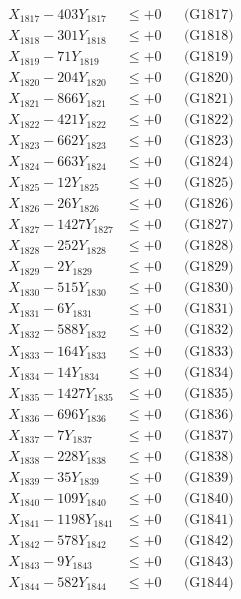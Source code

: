 \documentclass[a4paper,10pt]{article}
\begin{document}
{\begin{align}
X_{1817} - 403Y_{1817} &\leq +0 && \text{(G1817)} \\
X_{1818} - 301Y_{1818} &\leq +0 && \text{(G1818)} \\
X_{1819} - 71Y_{1819} &\leq +0 && \text{(G1819)} \\
X_{1820} - 204Y_{1820} &\leq +0 && \text{(G1820)} \\
\allowbreak
X_{1821} - 866Y_{1821} &\leq +0 && \text{(G1821)} \\
X_{1822} - 421Y_{1822} &\leq +0 && \text{(G1822)} \\
X_{1823} - 662Y_{1823} &\leq +0 && \text{(G1823)} \\
X_{1824} - 663Y_{1824} &\leq +0 && \text{(G1824)} \\
X_{1825} - 12Y_{1825} &\leq +0 && \text{(G1825)} \\
X_{1826} - 26Y_{1826} &\leq +0 && \text{(G1826)} \\
X_{1827} - 1427Y_{1827} &\leq +0 && \text{(G1827)} \\
X_{1828} - 252Y_{1828} &\leq +0 && \text{(G1828)} \\
X_{1829} - 2Y_{1829} &\leq +0 && \text{(G1829)} \\
X_{1830} - 515Y_{1830} &\leq +0 && \text{(G1830)} \\
\allowbreak
X_{1831} - 6Y_{1831} &\leq +0 && \text{(G1831)} \\
X_{1832} - 588Y_{1832} &\leq +0 && \text{(G1832)} \\
X_{1833} - 164Y_{1833} &\leq +0 && \text{(G1833)} \\
X_{1834} - 14Y_{1834} &\leq +0 && \text{(G1834)} \\
X_{1835} - 1427Y_{1835} &\leq +0 && \text{(G1835)} \\
X_{1836} - 696Y_{1836} &\leq +0 && \text{(G1836)} \\
X_{1837} - 7Y_{1837} &\leq +0 && \text{(G1837)} \\
X_{1838} - 228Y_{1838} &\leq +0 && \text{(G1838)} \\
X_{1839} - 35Y_{1839} &\leq +0 && \text{(G1839)} \\
X_{1840} - 109Y_{1840} &\leq +0 && \text{(G1840)} \\
\allowbreak
X_{1841} - 1198Y_{1841} &\leq +0 && \text{(G1841)} \\
X_{1842} - 578Y_{1842} &\leq +0 && \text{(G1842)} \\
X_{1843} - 9Y_{1843} &\leq +0 && \text{(G1843)} \\
X_{1844} - 582Y_{1844} &\leq +0 && \text{(G1844)} \\

\end{align}}
\end{document}
